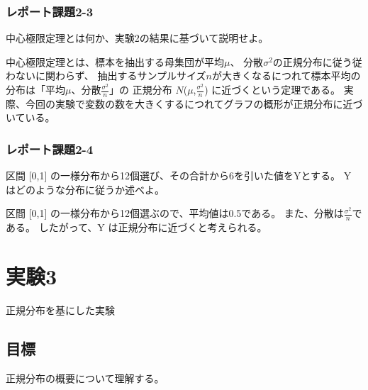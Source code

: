 \documentclass[12pt]{jarticle}
\begin{document}
\subsubsection*{レポート課題2-3}
\begin{shadebox}
    中心極限定理とは何か、実験2の結果に基づいて説明せよ。
\end{shadebox}
中心極限定理とは、標本を抽出する母集団が平均$\mu$、
分散$ \sigma^2$の正規分布に従う従わないに関わらず、
抽出するサンプルサイズ$n$が大きくなるにつれて標本平均の分布は「平均$\mu$、分散$\frac{\sigma^2}{n}$」の
正規分布 $N$($\mu$,$\frac{\sigma^2}{n}$) に近づくという定理である。
実際、今回の実験で変数の数を大きくするにつれてグラフの概形が正規分布に近づいている。

\subsubsection*{レポート課題2-4}
\begin{shadebox}
    区間 [0,1] の一様分布から12個選び、その合計から6を引いた値をYとする。
    Y はどのような分布に従うか述べよ。
\end{shadebox}
区間 [0,1] の一様分布から12個選ぶので、平均値は0.5である。
また、分散は$\frac{\sigma^2}{n}$である。
したがって、Y は正規分布に近づくと考えられる。

\clearpage

\section{実験3}
正規分布を基にした実験

\subsection{目標}
正規分布の概要について理解する。
\end{document}
